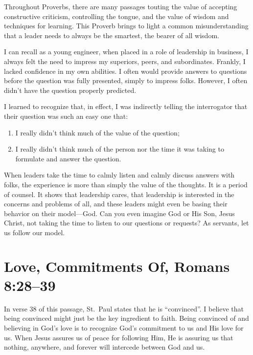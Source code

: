\documentclass[12pt]{memoir}
\begin{document}
Throughout Proverbs, there are many passages touting the value of
accepting constructive criticism, controlling the tongue, and the
value of wisdom and techniques for learning. This Proverb brings to light
a common misunderstanding that a leader needs to always be the smartest,
the bearer of all wisdom. 

I can recall as a young engineer, when placed in a role of leadership
in business, I always felt the need to impress my superiors, peers,
and subordinates. Frankly, I lacked confidence in my own abilities.
I often would provide answers to questions before the question was
fully presented, simply to impress folks. However, I often didn't
have the question properly predicted.

I learned to recognize that, in effect, I was indirectly telling the interrogator that their
question was such an easy one that:
\begin{enumerate}
\item I really didn't think much of the value of the question; 
\item I really didn't think much of the person nor the time it was taking
to formulate and answer the question. 
\end{enumerate}
When leaders take the time to calmly listen and calmly discuss answers
with folks, the experience is more than simply the value of the thoughts.
It is a period of counsel. It shows that leadership cares, that leadership
is interested in the concerns and problems of all, and these leaders
might even be basing their behavior on their model---God. Can you
even imagine God or His Son, Jesus Christ, not taking the time to
listen to our questions or requests? As servants, let us follow our model.

\section[Love, Commitments Of]{Love, Commitments Of, Romans 8:28--39}

In verse 38 of this passage, St.\ Paul states that he is ``convinced''.
I believe that being convinced might just be the key ingredient
to faith. Being convinced of and believing in God's love is to recognize
God's commitment to us and His love for us. When Jesus assures us of peace for following Him, He is assuring us that nothing, anywhere, and forever will intercede between
God and us. 
\end{document}
